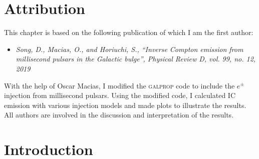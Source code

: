 \documentclass[doublespace,nopageskip]{VTthesis} %
\begin{document}
\section{Attribution}

This chapter is based on the following publication of which I am the first author:
\begin{itemize}
    \item \emph{Song, D., Macias, O., and Horiuchi, S., “Inverse Compton emission from millisecond pulsars in the Galactic bulge”, Physical Review D, vol. 99, no. 12, 2019}
\end{itemize}
With the help of Oscar Macias, I modified the \textsc{galprop} code to include the $e^\pm$ injection from millisecond pulsars. Using the modified code, I calculated IC emission with various injection models and made plots to illustrate the results. All authors are involved in the discussion and interpretation of the results.

\section{Introduction}
\end{document}
